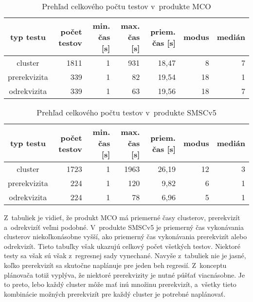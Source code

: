 \begin{table}
  \begin{center}
    \begin{tabular}{| c | r | r | r | r | r | r |}
    \hline
    typ testu & počet testov & min. čas [s] & max. čas [s] & priem. čas [s] & modus & medián \\ \hline
    cluster      & 1811 & 1 & 931 & 18,47 & 8  & 7 \\ \hline
    prerekvizita & 339  & 1 & 82  & 19,54 & 18 & 1 \\ \hline
    odrekvizita  & 339  & 1 & 63  & 19,56 & 18 & 7 \\
    \hline
    \end{tabular}
    \label{tabulka:testy_mco}
    \caption{Prehľad celkového počtu testov v~produkte MCO}
  \end{center}
\end{table}

\begin{table}
  \begin{center}
    \begin{tabular}{| c | r | r | r | r | r | r |}
    \hline
    typ testu & počet testov & min. čas [s] & max. čas [s] & priem. čas [s] & modus & medián \\ \hline
    cluster      & 1723 & 1 & 1963 & 26,19 & 12 & 3 \\ \hline
    prerekvizita & 224  & 1 & 120  & 9,82  & 6  & 1 \\ \hline
    odrekvizita  & 224  & 1 & 78   & 6,96  & 5  & 1 \\
    \hline
    \end{tabular}
    \label{tabulka:testy_smscv5}
    \caption{Prehľad celkového počtu testov v~produkte SMSCv5}
  \end{center}
\end{table}

Z~tabuliek je vidieť, že produkt MCO má priemerné časy clusterov, prerekvizít a~odrekvizíť veľmi podobné.
V~produkte SMSCv5 je priemerný čas vykonávania clusterov niekoľkonásobne vyšší, ako priemerný čas vykonávania prerekvizít alebo odrekvizít.
Tieto tabuľky však ukazujú celkový počet všetkých testov. Niektoré testy sa však sú však z~regresnej sady vynechané.
Navyše z~tabuliek nie je jasné, koľko prerekvizít sa skutočne naplánuje pre jeden beh regresií.
Z~konceptu plánovača totiž vyplýva, že niektoré prerekvizity je nutné púšťať viacnásobne.
Je to preto, lebo každý cluster môže mať inú množinu prerekvizít, a~všetky tieto kombinácie možných prerekvizít pre každý cluster
je potrebné naplánovať.


